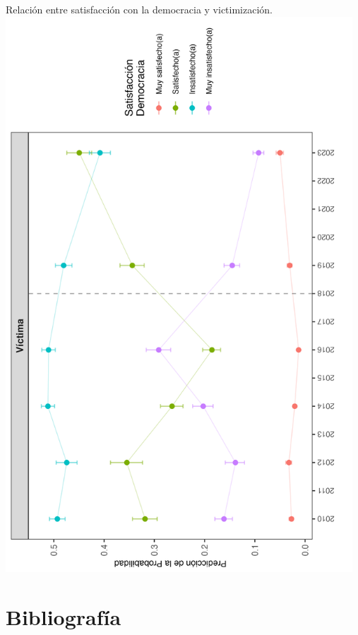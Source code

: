 \documentclass[letterpaper]{article}
\begin{document}
\begin{center}
Relación entre satisfacción con la democracia y victimización.
\includegraphics[width = 13cm]{plot_dem_02.png}
    \label{tab:plot6}
\end{center}

\vspace{-0.4cm}

\section{Bibliografía}

\vspace{0.1cm}

\printbibliography[heading = none]
\end{document}
